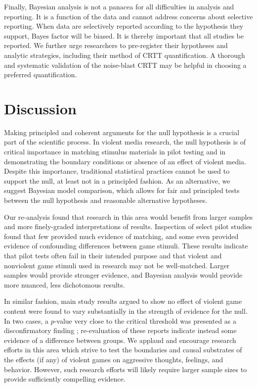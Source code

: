 \documentclass[man]{apa6}
\begin{document}
Finally, Bayesian analysis is not a panacea for all difficulties in analysis and reporting.  It is a function of the data and cannot address concerns about selective reporting.  When data are selectively reported according to the hypothesis they support, Bayes factor will be biased. It is thereby important that all studies be reported. 
% 
We further urge researchers to pre-register their hypotheses and analytic strategies, including their method of CRTT quantification. A thorough and systematic validation of the noise-blast CRTT may be helpful in choosing a preferred quantification. 

\section{Discussion} 
Making principled and coherent arguments for the null hypothesis is a crucial part of the scientific process. In violent media research, the null hypothesis is of critical importance in matching stimulus materials in pilot testing and in demonstrating the boundary conditions or absence of an effect of violent media. Despite this importance, traditional statistical practices cannot be used to support the null, at least not in a principled fashion. As an alternative, we suggest Bayesian model comparison, which allows for fair and principled tests between the null hypothesis and reasonable alternative hypotheses.

Our re-analysis found that research in this area would benefit from larger samples and more finely-graded interpretations of results. Inspection of select pilot studies found that few provided much evidence of matching, and some even provided evidence of confounding differences between game stimuli. These results indicate that pilot tests often fail in their intended purpose and that violent and nonviolent game stimuli used in research may not be well-matched. Larger samples would provide stronger evidence, and Bayesian analysis would provide more nuanced, less dichotomous results.

In similar fashion, main study results argued to show no effect of violent game content were found to vary substantially in the strength of evidence for the null. In two cases, a $p$-value very close to the critical threshold was presented as a disconfirmatory finding \citep{Elson:etal:2013,Valadez:Ferguson:2012}; re-evaluation of these reports indicate instead some evidence of a difference between groups. We applaud and encourage research efforts in this area which strive to test the boundaries and causal substrates of the effects (if any) of violent games on aggressive thoughts, feelings, and behavior. However, such research efforts will likely require larger sample sizes to provide sufficiently compelling evidence. 
\end{document}
